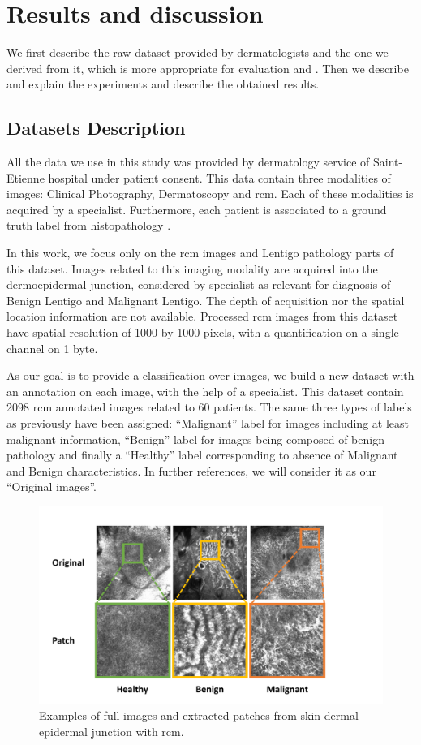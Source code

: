 \section{Results and discussion}
\label{results}
We first describe the raw dataset provided by dermatologists and the one we derived from it, which is more appropriate for evaluation and . Then we describe and explain the experiments and describe the obtained results.\par
\subsection{Datasets Description}
All the data we use in this study was provided by dermatology service of Saint-Etienne hospital under patient consent. This data contain three modalities of images: Clinical Photography, Dermatoscopy and \ac{rcm}. Each of these modalities is acquired by a specialist. Furthermore, each patient is associated to a ground truth label from histopathology \cite{Cinotti2018}.\par
In this work, we focus only on the \ac{rcm} images and Lentigo pathology parts of this dataset. Images related to this imaging modality are acquired into the dermoepidermal junction, considered by specialist as relevant for diagnosis of Benign Lentigo and Malignant Lentigo. The depth of acquisition nor the spatial location information are not available. Processed \ac{rcm} images from this dataset have spatial resolution of 1000 by 1000 pixels, with a quantification on a single channel on 1 byte.\par
As our goal is to provide a classification over images, we build a new dataset with an annotation on each image, with the help of a specialist. This dataset contain 2098 \ac{rcm} annotated images related to 60 patients. The same three types of labels as previously have been assigned: “Malignant” label for images including at least malignant information, “Benign” label for images being composed of benign pathology and finally a “Healthy” label corresponding to absence of Malignant and Benign characteristics. In further references, we will consider it as our “Original images”.\par
\begin{figure}[H]
\centering
    \includegraphics[width=0.9\linewidth]{content/figures/Data.pdf}
    \caption{Examples of full images and extracted patches from skin dermal-epidermal junction with \ac{rcm}.}
    \label{data}
\end{figure}

